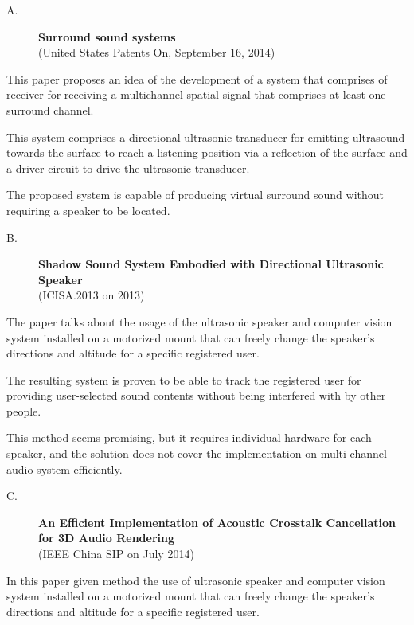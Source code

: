 \documentclass[../../../patent_v1.tex]{subfiles}
\begin{document}
    
\begin{description}
    \item[A.]\textbf{Surround sound systems}\\(United States Patents On, September 16, 2014)
\end{description}

This paper proposes an idea of the development of a system that comprises of receiver 
for receiving a multichannel spatial signal that comprises at least one surround channel.

This system comprises a directional ultrasonic transducer for emitting ultrasound 
towards the surface to reach a listening position via a reflection of the surface and a 
driver circuit to drive the ultrasonic transducer.

The proposed system is capable of producing virtual surround sound without requiring a 
speaker to be located.

\begin{description}
    \item[B.]\textbf{Shadow Sound System Embodied with Directional Ultrasonic Speaker}\\(ICISA.2013 on 2013) 
\end{description}

The paper talks about the usage of the ultrasonic speaker and computer vision system 
installed on a motorized mount that can freely change the speaker’s directions and 
altitude for a specific registered user.

The resulting system is proven to be able to track the registered 
user for providing user-selected sound contents without being 
interfered with by other people.

This method seems promising, but it requires individual hardware 
for each speaker, and the solution does not cover the implementation 
on multi-channel audio system efficiently.

\begin{description}
    \item[C.]\textbf{An Efficient Implementation of Acoustic Crosstalk Cancellation for 3D Audio Rendering}\\(IEEE China SIP on July 2014)    
\end{description}

In this paper given method the use of ultrasonic speaker and computer 
vision system installed on a motorized mount that can freely change 
the speaker’s directions and altitude for a specific registered user.
\end{document}
